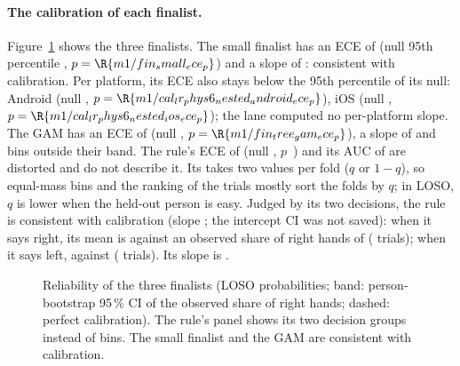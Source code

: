 
\paragraph{The calibration of each finalist.} Figure~\ref{fig:M1_15_finalist_calibration} shows the
three finalists. The small finalist has an ECE of  (null 95th percentile
, $p = \R{m1/fin_small_ece_p}$) and a slope of
: consistent with calibration. Per platform, its ECE also stays below the
95th percentile of its null: Android  (null
, $p = \R{m1/cal_lr_phys6_nested_android_ece_p}$), iOS
 (null ,
$p = \R{m1/cal_lr_phys6_nested_ios_ece_p}$); the lane computed no per-platform slope. The GAM has
an ECE of  (null ,
$p = \R{m1/fin_tree_gam_ece_p}$), a slope of  and
 bins outside their band. The rule's ECE of 
(null , $p$~) and its AUC of  are distorted and
do not describe it. Its \pright{} takes two values per fold ($q$ or $1-q$), so equal-mass bins and the
ranking of the trials mostly sort the folds by $q$; in LOSO, $q$ is lower when the held-out person is
easy. Judged by its two decisions, the rule is consistent with calibration (slope
; the intercept CI was not saved): when it says right, its mean \pright{} is
 against an observed share of right hands of
 ( trials); when it says
left,  against 
( trials). Its slope is .

\begin{figure}[tbp]
  \centering
  \caption{Reliability of the three finalists (LOSO probabilities; band: person-bootstrap 95\,\% CI
  of the observed share of right hands; dashed: perfect calibration). The rule's panel shows its two
  decision groups instead of bins. The small finalist and the GAM are consistent with calibration.}
  \label{fig:M1_15_finalist_calibration}
\end{figure}

